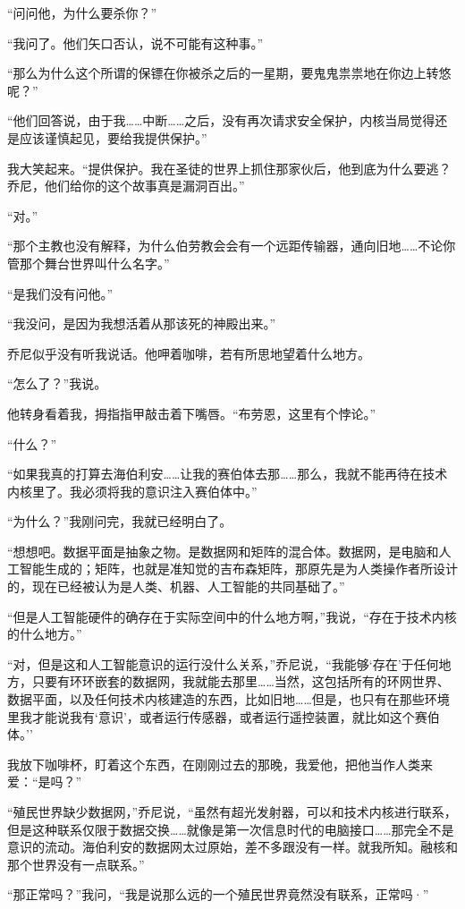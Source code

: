 \documentclass[AutoFakeBold=true]{book}
\begin{document}
``问问他，为什么要杀你？''

``我问了。他们矢口否认，说不可能有这种事。''

``那么为什么这个所谓的保镖在你被杀之后的一星期，要鬼鬼祟祟地在你边上转悠呢？''

``他们回答说，由于我……中断……之后，没有再次请求安全保护，内核当局觉得还是应该谨慎起见，要给我提供保护。''

我大笑起来。``提供保护。我在圣徒的世界上抓住那家伙后，他到底为什么要逃？乔尼，他们给你的这个故事真是漏洞百出。''

``对。''

``那个主教也没有解释，为什么伯劳教会会有一个远距传输器，通向旧地……不论你管那个舞台世界叫什么名字。''

``是我们没有问他。''

``我没问，是因为我想活着从那该死的神殿出来。''

乔尼似乎没有听我说话。他呷着咖啡，若有所思地望着什么地方。

``怎么了？''我说。

他转身看着我，拇指指甲敲击着下嘴唇。``布劳恩，这里有个悖论。''

``什么？''

``如果我真的打算去海伯利安……让我的赛伯体去那……那么，我就不能再待在技术内核里了。我必须将我的意识注入赛伯体中。''

``为什么？''我刚问完，我就已经明白了。

``想想吧。数据平面是抽象之物。是数据网和矩阵的混合体。数据网，是电脑和人工智能生成的；矩阵，也就是准知觉的吉布森矩阵，那原先是为人类操作者所设计的，现在已经被认为是人类、机器、人工智能的共同基础了。''

``但是人工智能硬件的确存在于实际空间中的什么地方啊，''我说，``存在于技术内核的什么地方。''

``对，但是这和人工智能意识的运行没什么关系，''乔尼说，``我能够`存在'于任何地方，只要有环环嵌套的数据网，我就能去那里……当然，这包括所有的环网世界、数据平面，以及任何技术内核建造的东西，比如旧地……但是，也只有在那些环境里我才能说我有`意识'，或者运行传感器，或者运行遥控装置，就比如这个赛伯体。''

我放下咖啡杯，盯着这个东西，在刚刚过去的那晚，我爱他，把他当作人类来爱：``是吗？''

``殖民世界缺少数据网，''乔尼说，``虽然有超光发射器，可以和技术内核进行联系，但是这种联系仅限于数据交换……就像是第一次信息时代的电脑接口……那完全不是意识的流动。海伯利安的数据网太过原始，差不多跟没有一样。就我所知。融核和那个世界没有一点联系。''

``那正常吗？''我问，``我是说那么远的一个殖民世界竟然没有联系，正常吗·''
\end{document}
